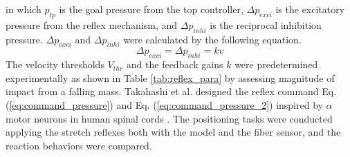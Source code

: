 in which $p_{tp}$ is the goal pressure from the top controller, $\Delta p_{exci}$ is the excitatory pressure from the reflex mechanism, and $ \Delta p_{inhi}$ is the reciprocal inhibition pressure. 
$\Delta p_{exci}$ and $\Delta p_{inhi}$ were calculated by the following equation.
\begin{equation}
    \label{eq:reflex_pressure}
    \Delta p_{exci} =  \Delta p_{inhi} = kv
\end{equation}
The velocity thresholds $V_{thr}$ and the feedback gains $k$ were predetermined experimentally as shown in Table \ref{tab:reflex_para} by assessing magnitude of impact from a falling mass. Takahashi et al. designed the reflex command Eq. (\ref{eq:command_pressure}) and Eq. (\ref{eq:command_pressure_2}) inspired by $\alpha$ motor neurons in human spinal cords \cite{takahashi}. The positioning tasks were conducted applying the stretch reflexes both with the model and the fiber sensor, and the reaction behaviors were compared.